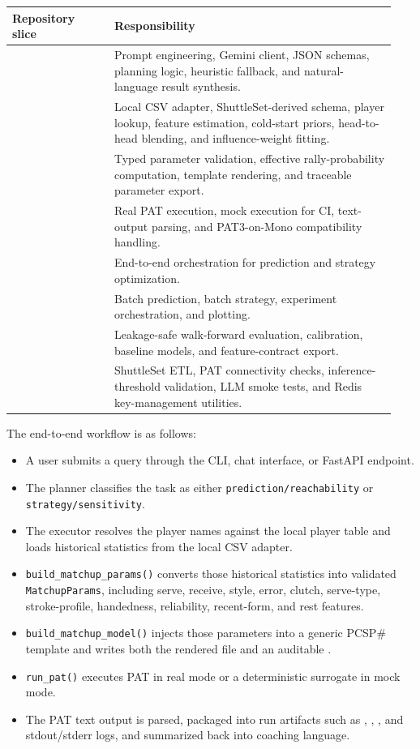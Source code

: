 \documentclass{article}
\begin{document}
\begin{table}[H]
\centering
\small
\begin{tabular}{L{0.25\linewidth}L{0.69\linewidth}}
\toprule
Repository slice & Responsibility \\
\midrule
{} & Prompt engineering, Gemini client, JSON schemas, planning logic, heuristic fallback, and natural-language result synthesis. \\
 & Local CSV adapter, ShuttleSet-derived schema, player lookup, feature estimation, cold-start priors, head-to-head blending, and influence-weight fitting. \\
 & Typed parameter validation, effective rally-probability computation, template rendering, and traceable parameter export. \\
 & Real PAT execution, mock execution for CI, text-output parsing, and PAT3-on-Mono compatibility handling. \\
 & End-to-end orchestration for prediction and strategy optimization. \\
 & Batch prediction, batch strategy, experiment orchestration, and plotting. \\
 & Leakage-safe walk-forward evaluation, calibration, baseline models, and feature-contract export. \\
 & ShuttleSet ETL, PAT connectivity checks, inference-threshold validation, LLM smoke tests, and Redis key-management utilities. \\
\bottomrule
\end{tabular}
\end{table}

The end-to-end workflow is as follows:

\begin{itemize}
\item A user submits a query through the CLI, chat interface, or FastAPI endpoint.
\item The planner classifies the task as either \texttt{prediction/reachability} or \texttt{strategy/sensitivity}.
\item The executor resolves the player names against the local player table and loads historical statistics from the local CSV adapter.
\item \texttt{build\_matchup\_params()} converts those historical statistics into validated \texttt{MatchupParams}, including serve, receive, style, error, clutch, serve-type, stroke-profile, handedness, reliability, recent-form, and rest features.
\item \texttt{build\_matchup\_model()} injects those parameters into a generic PCSP\# template and writes both the rendered  file and an auditable .
\item \texttt{run\_pat()} executes PAT in real mode or a deterministic surrogate in mock mode.
\item The PAT text output is parsed, packaged into run artifacts such as , , , and stdout/stderr logs, and summarized back into coaching language.
\end{itemize}
\end{document}
